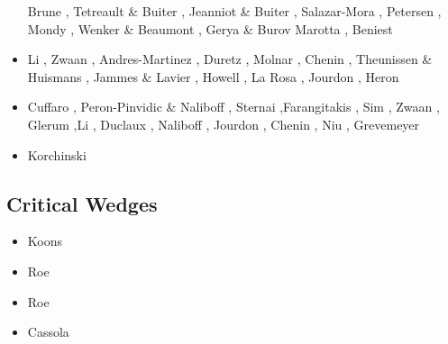 \begin{scriptsize}
\begin{itemize}
                      Brune \cite{brun18}, Tetreault \& Buiter \cite{tebu18},
                      Jeanniot \& Buiter \cite{jebu18}, Salazar-Mora \etal \cite{sahf18},
                      Petersen \etal \cite{pesn18}, Mondy \etal \cite{mord18},
                      Wenker \& Beaumont \cite{webe18,webe18b},
                      Gerya \& Burov \cite{gebu18} Marotta \etal \cite{marc18},
                      Beniest \etal \cite{bews18} 
\item[\twothousandnineteen] Li \etal \cite{lisp19}, Zwaan \etal \cite{zwsb19}, 
                      Andres-Martinez \etal \cite{anpa19}, Duretz \etal \cite{dual19},
                      Molnar \etal \cite{mocb19}, Chenin \etal \cite{chmd19},
                      Theunissen \& Huismans \cite{thhu19}, Jammes \& Lavier \cite{jala19},
                      Howell \etal \cite{hooi19}, La Rosa \etal \cite{lapk19}, 
                      Jourdon \etal \cite{jolm19}, Heron \etal \cite{hepm19}
\item[\twothousandtwenty] Cuffaro \etal \cite{cump20}, Peron-Pinvidic \& Naliboff \cite{pena20}, 
                          Sternai \cite{ster20},Farangitakis \etal \cite{fahm20}, Sim \etal \cite{siss20}, 
                          Zwaan \etal \cite{zwsr20}, Glerum \etal \cite{glbs20},Li \etal \cite{lial20}, 
                          Duclaux \etal \cite{duhm20}, Naliboff \etal \cite{nagb20}, 
                          Jourdon \etal \cite{jolm20}, Chenin \etal \cite{chsm20}, 
                          Niu \cite{niu20}, Grevemeyer \etal \cite{grrm21}
\item[\twothousandtwentyone] Korchinski \etal \cite{kotr21}
\end{itemize}
\end{scriptsize}

\subsection{Critical Wedges}

\begin{scriptsize}
\begin{itemize}
\item[\nineteenninetyfour] Koons \cite{koon94}
\item[\twothousandsix] Roe \etal \cite{rosw06}
\item[\twothousandeight] Roe \etal \cite{rowf08}
\item[\twothousandthirteen] Cassola \cite{cass13}
\end{itemize}
\end{scriptsize}

